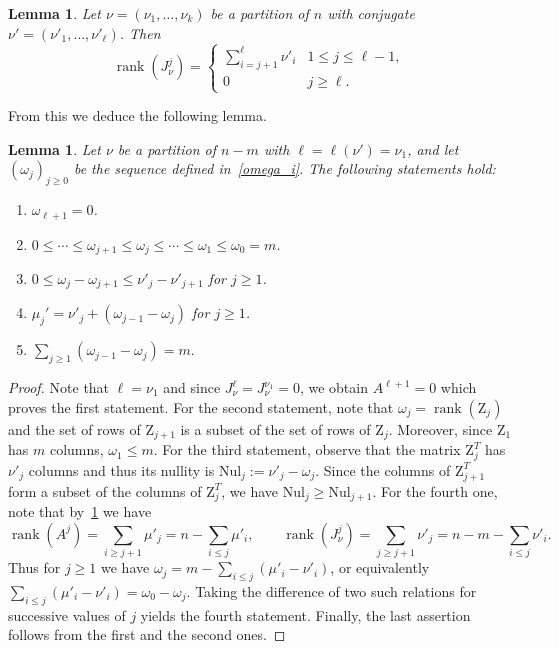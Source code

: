 \documentclass[12pt,a4paper,reqno]{amsart}
\theoremstyle{plain}
\newtheorem{lemma}[theorem]{Lemma}
\theoremstyle{definition}
\newcommand{\1}{\mathds{1}}
\newcommand{\Z}{\mathrm{Z}}
\DeclareMathOperator{\rk}{rank}
\begin{document}
\begin{lemma}\label{rankJmu}  Let $\nu=(\nu_1,\dots,\nu_k)$ be a partition of $n$ with conjugate  $\nu'=(\nu'_1,\dots,\nu'_\ell)$. Then
\begin{equation}\label{Jordan-rank}
\rk\left(J_\nu^j\right)=
\begin{cases}
\sum_{i=j+1}^\ell \nu'_i  & 1\leq j\leq \ell-1,\\
0 & j\geq \ell.
\end{cases}
\end{equation}
\end{lemma} 
From this we deduce the following lemma. 
\begin{lemma}\label{lem:iffcondition} Let $\nu$ be a partition of $n-m$ with $\ell = \ell(\nu')=\nu_1$, and let $(\omega_j)_{j \geq 0}$ be the sequence defined in~\cref{omega_i}. The following statements hold:

\begin{enumerate}\setlength{\itemsep}{0.5em}
\item $\omega_{\ell+1}=0$.
\item $0\leq \cdots\leq \omega_{j+1}\leq \omega_j\leq \cdots\leq \omega_1\leq \omega_0=m$.
\item $0\leq \omega_j-\omega_{j+1}\leq \nu'_j-\nu'_{j+1}$ for $j\geq 1$.
\item $\mu_j'=\nu'_j+(\omega_{j-1}-\omega_{j})$ for $j\geq 1$.
\item $\sum_{j\geq 1}(\omega_{j-1}-\omega_j)=m.$
\end{enumerate} 
\end{lemma}
\begin{proof}
Note that $\ell=\nu_1$ and since
$J_{\nu}^\ell=J_{\nu}^{\nu_1}=0$, we obtain  $A^{\ell+1}=0$ which proves the first statement. For the second statement, note that  $\omega_j=\rk(\Z_j)$ and the set of rows of $\Z_{j+1}$ is a subset of the set of rows of $\Z_j$. Moreover, since $\Z_1$ has $m$ columns,  $\omega_1\leq m$.  For the third statement, observe that the matrix $\Z_j^T$ has $\nu'_j$ columns and thus its nullity is $\mathrm{Nul}_j:=\nu'_j-\omega_j$. Since the columns of $\Z_{j+1}^T$ form a subset of the columns of $\Z_j^T$, we have
$\mathrm{Nul}_j\geq \mathrm{Nul}_{j+1}$.
For the fourth one, note that by~\cref{rankJmu}
we have
$$
\rk(A^j)=\sum_{i\geq j+1}\mu'_j=n-\sum_{i\leq j}\mu'_i,\qquad \rk(J_{\nu}^j)=\sum_{j\geq j+1}\nu'_j=n-m-\sum_{i\leq j}\nu'_i. 
$$
Thus for $j\geq 1$ we have
$
\omega_j=m-\sum_{i\leq j}(\mu'_i-\nu'_i)$, or equivalently 
$\sum_{i\leq j}(\mu'_i-\nu'_i)=\omega_0-\omega_j$. Taking the difference of two such relations for successive values of $j$ yields the fourth statement. Finally, the last assertion follows from the first and the second ones. 
\end{proof}
\end{document}
